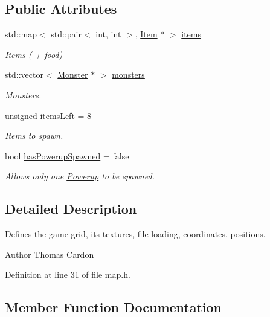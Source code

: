 \subsection*{Public Attributes}
\begin{DoxyCompactItemize}
\item 
std\+::map$<$ std\+::pair$<$ int, int $>$, \hyperlink{structns_game_1_1_item}{Item} $\ast$ $>$ \hyperlink{classns_game_1_1_map_a8f7fa9511b608d41345adf1f3e3d1b29}{items}
\begin{DoxyCompactList}\small\item\em Items ( + food) \end{DoxyCompactList}\item 
std\+::vector$<$ \hyperlink{classns_game_1_1_monster}{Monster} $\ast$ $>$ \hyperlink{classns_game_1_1_map_a5c82576202dc341ba011c4cd65f6a60c}{monsters}
\begin{DoxyCompactList}\small\item\em Monsters. \end{DoxyCompactList}\item 
unsigned \hyperlink{classns_game_1_1_map_addc6c2a156c156ee05b389fa9f500a20}{items\+Left} = 8
\begin{DoxyCompactList}\small\item\em Items to spawn. \end{DoxyCompactList}\item 
bool \hyperlink{classns_game_1_1_map_a494c2e9e96c882ca8f8661a62b87ce84}{has\+Powerup\+Spawned} = false
\begin{DoxyCompactList}\small\item\em Allows only one \hyperlink{classns_game_1_1_powerup}{Powerup} to be spawned. \end{DoxyCompactList}\end{DoxyCompactItemize}


\subsection{Detailed Description}
Defines the game grid, its textures, file loading, coordinates, positions. 

\begin{DoxyAuthor}{Author}
Thomas Cardon 
\end{DoxyAuthor}


Definition at line 31 of file map.\+h.



\subsection{Member Function Documentation}
\mbox{\label{classns_game_1_1_map_a9c7ae85f01db94d0bedbce4aee4d52f0}} 
